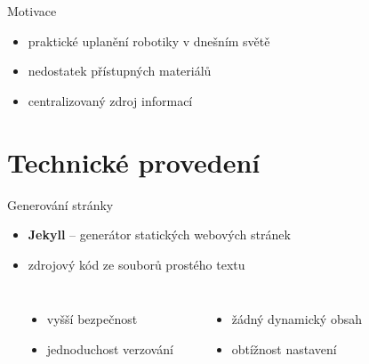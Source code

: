 \documentclass[14pt, hyperref={unicode}]{beamer}
\title{\makebox[\linewidth]{Robotika jednoduše}}
\date{\today}
\author{Tomáš Sláma}
\institute{Gymnázium Turnov}
\begin{document}
  \maketitle

  \begin{frame}{Motivace}
    \begin{itemize}
      \item<+-> praktické uplanění robotiky v dnešním světě
      \item<+-> nedostatek přístupných materiálů
      \item<+-> centralizovaný zdroj informací
    \end{itemize}
  \end{frame}

  \section{Technické provedení}

  \begin{frame}{Generování stránky}
    \begin{itemize}
      \item<+-> \textbf{Jekyll} -- generátor statických webových stránek
      \item<+-> zdrojový kód ze souborů prostého textu
    \end{itemize}

    \begin{columns}[T, onlytextwidth]
      \footnotesize
        \begin{center}
        \end{center}
        \begin{itemize}[<+- | alert@+>]
          \item vyšší bezpečnost
          \item jednoduchost verzování
        \end{itemize}
        \begin{center}
        \end{center}
        \begin{itemize}[<+- | alert@+>]
          \item žádný dynamický obsah
          \item obtížnost nastavení
        \end{itemize}
    \end{columns}
  \end{frame}
\end{document}
